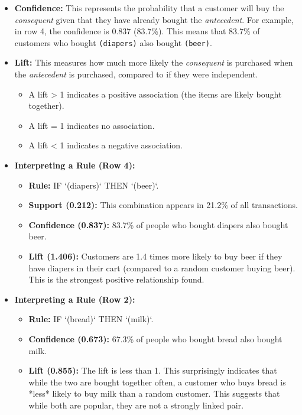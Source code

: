 \documentclass[12pt,a4paper]{article}
\begin{document}
\begin{itemize}
    \item \textbf{Confidence:} This represents the probability that a customer will buy the \textit{consequent} given that they have already bought the \textit{antecedent}. For example, in row 4, the confidence is 0.837 (83.7\%). This means that 83.7\% of customers who bought \texttt{(diapers)} also bought \texttt{(beer)}.
    
    \item \textbf{Lift:} This measures how much more likely the \textit{consequent} is purchased when the \textit{antecedent} is purchased, compared to if they were independent.
        \begin{itemize}
            \item A lift > 1 indicates a positive association (the items are likely bought together).
            \item A lift = 1 indicates no association.
            \item A lift < 1 indicates a negative association.
        \end{itemize}
    
    \item \textbf{Interpreting a Rule (Row 4):}
        \begin{itemize}
            \item \textbf{Rule:} IF `(diapers)` THEN `(beer)`.
            \item \textbf{Support (0.212):} This combination appears in 21.2\% of all transactions.
            \item \textbf{Confidence (0.837):} 83.7\% of people who bought diapers also bought beer.
            \item \textbf{Lift (1.406):} Customers are 1.4 times more likely to buy beer if they have diapers in their cart (compared to a random customer buying beer). This is the strongest positive relationship found.
        \end{itemize}
        
    \item \textbf{Interpreting a Rule (Row 2):}
        \begin{itemize}
            \item \textbf{Rule:} IF `(bread)` THEN `(milk)`.
            \item \textbf{Confidence (0.673):} 67.3\% of people who bought bread also bought milk.
            \item \textbf{Lift (0.855):} The lift is less than 1. This surprisingly indicates that while the two are bought together often, a customer who buys bread is *less* likely to buy milk than a random customer. This suggests that while both are popular, they are not a strongly linked pair.
        \end{itemize}
\end{itemize}
\end{document}
